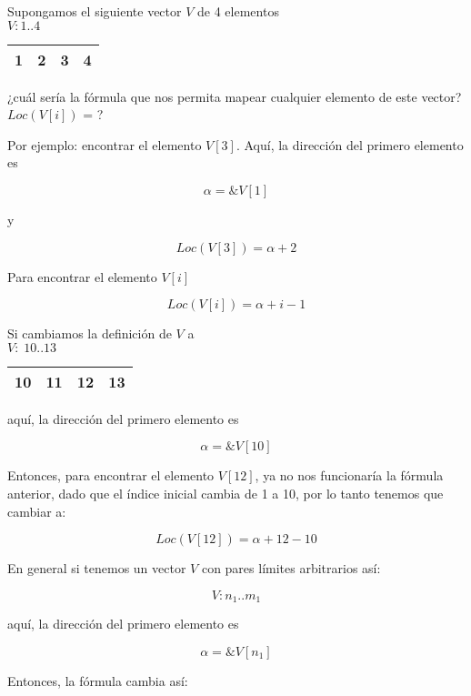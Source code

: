 Supongamos el siguiente vector $V$ de 4 elementos\\

\hspace{1in} $V: 1 .. 4$

\begin{center}
  \begin{tabular}{|c|c|c|c|}
    \hline
    1 & 2 & 3 & 4\\ \hline
  \end{tabular}
\end{center}

¿cuál sería la fórmula que nos permita mapear cualquier elemento de
este vector?  $Loc \left(V[i] \right)$ = ?

Por ejemplo: encontrar el elemento $V[3]$. Aquí, la dirección del
primero elemento es

$$ \alpha = \&V[1]$$

y

$$Loc \left( V[3] \right) =  \alpha + 2$$

Para encontrar el elemento $V[i]$

$$Loc \left( V[i] \right) = \alpha + i - 1$$

Si cambiamos la definición de $V$ a\\

\hspace{1in} $V:\; 10..13$

\begin{center}
  \begin{tabular}{|c|c|c|c|}
    \hline
    10 & 11 & 12 & 13\\ \hline
  \end{tabular}
\end{center}

aquí, la dirección del primero elemento es

$$ \alpha = \&V[10]$$

Entonces, para encontrar el elemento $V[12]$, ya no nos funcionaría la
fórmula anterior, dado que el índice inicial cambia de 1 a 10, por lo
tanto tenemos que cambiar a:

$$Loc \left( V[12] \right) = \alpha + 12 - 10$$

En general si tenemos un vector $V$ con pares límites arbitrarios así:

$$V: n_1..m_1$$

aquí, la dirección del primero elemento es

$$ \alpha = \&V[n_1]$$

Entonces, la fórmula cambia así:

